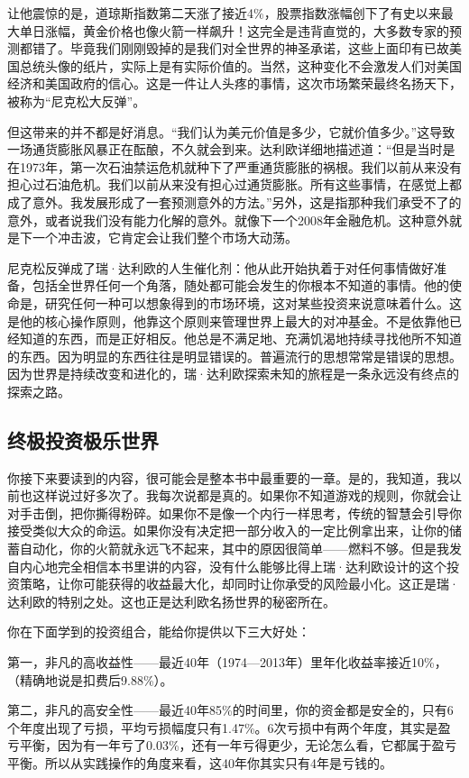 让他震惊的是，道琼斯指数第二天涨了接近4\%，股票指数涨幅创下了有史以来最大单日涨幅，黄金价格也像火箭一样飙升！这完全是违背直觉的，大多数专家的预测都错了。毕竟我们刚刚毁掉的是我们对全世界的神圣承诺，这些上面印有已故美国总统头像的纸片，实际上是有实际价值的。当然，这种变化不会激发人们对美国经济和美国政府的信心。这是一件让人头疼的事情，这次市场繁荣最终名扬天下，被称为“尼克松大反弹”。

但这带来的并不都是好消息。“我们认为美元价值是多少，它就价值多少。”这导致一场通货膨胀风暴正在酝酿，不久就会到来。达利欧详细地描述道：“但是当时是在1973年，第一次石油禁运危机就种下了严重通货膨胀的祸根。我们以前从来没有担心过石油危机。我们以前从来没有担心过通货膨胀。所有这些事情，在感觉上都成了意外。我发展形成了一套预测意外的方法。”另外，这是指那种我们承受不了的意外，或者说我们没有能力化解的意外。就像下一个2008年金融危机。这种意外就是下一个冲击波，它肯定会让我们整个市场大动荡。

尼克松反弹成了瑞·达利欧的人生催化剂：他从此开始执着于对任何事情做好准备，包括全世界任何一个角落，随处都可能会发生的你根本不知道的事情。他的使命是，研究任何一种可以想象得到的市场环境，这对某些投资来说意味着什么。这是他的核心操作原则，他靠这个原则来管理世界上最大的对冲基金。不是依靠他已经知道的东西，而是正好相反。他总是不满足地、充满饥渴地持续寻找他所不知道的东西。因为明显的东西往往是明显错误的。普遍流行的思想常常是错误的思想。因为世界是持续改变和进化的，瑞·达利欧探索未知的旅程是一条永远没有终点的探索之路。

\subsection{终极投资极乐世界}

你接下来要读到的内容，很可能会是整本书中最重要的一章。是的，我知道，我以前也这样说过好多次了。我每次说都是真的。如果你不知道游戏的规则，你就会让对手击倒，把你撕得粉碎。如果你不是像一个内行一样思考，传统的智慧会引导你接受类似大众的命运。如果你没有决定把一部分收入的一定比例拿出来，让你的储蓄自动化，你的火箭就永远飞不起来，其中的原因很简单——燃料不够。但是我发自内心地完全相信本书里讲的内容，没有什么能够比得上瑞·达利欧设计的这个投资策略，让你可能获得的收益最大化，却同时让你承受的风险最小化。这正是瑞·达利欧的特别之处。这也正是达利欧名扬世界的秘密所在。

你在下面学到的投资组合，能给你提供以下三大好处：

第一，非凡的高收益性——最近40年（1974—2013年）里年化收益率接近10\%，（精确地说是扣费后9.88\%）。

第二，非凡的高安全性——最近40年85\%的时间里，你的资金都是安全的，只有6个年度出现了亏损，平均亏损幅度只有1.47\%。6次亏损中有两个年度，其实是盈亏平衡，因为有一年亏了0.03\%，还有一年亏得更少，无论怎么看，它都属于盈亏平衡。所以从实践操作的角度来看，这40年你其实只有4年是亏钱的。

